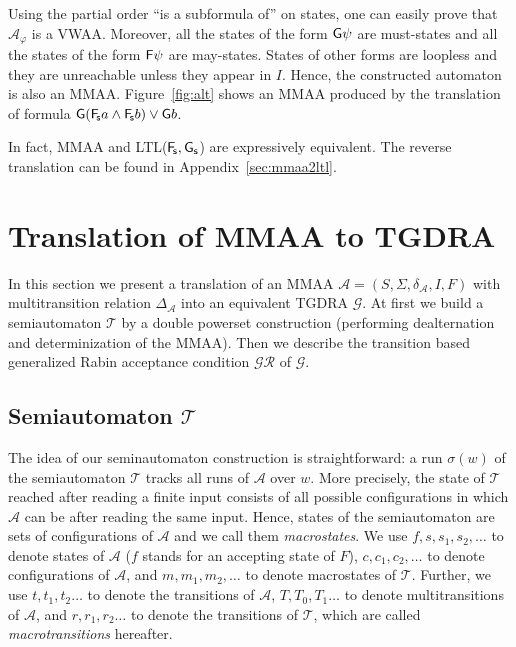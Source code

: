 \documentclass{llncs}
\newcommand{\mA}{\mathcal{A}}
\newcommand{\mG}{\mathcal{G}}
\newcommand{\mGR}{\mathcal{GR}}
\newcommand{\mT}{\mathcal{T}}
\newcommand{\A}{_{\mA}}			\newcommand{\T}{_{\mT}}
\begin{document}
Using the partial order ``is a subformula of'' on states, one can easily
prove that $\mA_\varphi$ is a VWAA.  Moreover, all the states of the form
$\mathsf{G}\psi$ are must-states and all the states of the form $\mathsf{F}\psi$ are may-states.
States of other forms are loopless and they are unreachable unless they
appear in $I$. Hence, the constructed automaton is also an MMAA.
Figure~\ref{fig:alt} shows an MMAA produced by the translation of formula
$\mathsf{G}({\mathsf{F}\!_\mathsf{s}} a \land {\mathsf{F}\!_\mathsf{s}} b) \lor \mathsf{G} b$.



In fact, MMAA and LTL(${\mathsf{F}\!_\mathsf{s}},{\mathsf{G}_\mathsf{s}}$) are expressively equivalent.  The reverse
translation can be found in Appendix~\ref{sec:mmaa2ltl}.



\section{Translation of MMAA to TGDRA}
\label{sec:MMAA2DRA}
In this section we present a translation of an MMAA $\mA =
(S,\Sigma,\delta\A,I,F)$ with multitransition relation $\Delta\A$ into an
equivalent TGDRA $\mG$. At first we build a semiautomaton $\mT$ by a double
powerset construction (performing dealternation and determinization of the
MMAA). Then we describe the transition based generalized Rabin acceptance
condition $\mGR$ of $\mG$.



\subsection{Semiautomaton $\mT$}
\label{sec:ts}
The idea of our seminautomaton construction is straightforward: a run
$\sigma(w)$ of the semiautomaton $\mT$ tracks all runs of $\mA$ over $w$.
More precisely, the state of $\mT$ reached after reading a finite input
consists of all possible configurations in which $\mA$ can be after reading
the same input.  Hence, states of the semiautomaton are sets of
configurations of $\mA$ and we call them \emph{macrostates}.  We use
$f,s,s_1,s_2,\ldots$ to denote states of $\mA$ ($f$ stands for an accepting
state of $F$), $c,c_1,c_2,\ldots$ to denote configurations of $\mA$, and
$m,m_1,m_2,\ldots$ to denote macro\-states of $\mT$.  Further, we use
$t,t_1,t_2\ldots$ to denote the transitions of $\mA$, $T,T_0,T_1\ldots$ to
denote multitransitions of $\mA$, and $r,r_1,r_2\ldots$ to denote the
transitions of $\mT$, which are called \emph{macrotransitions} hereafter.
\end{document}
